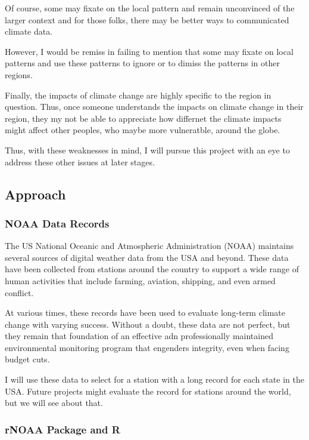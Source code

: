 \documentclass{article}
\begin{document}
Of course, some may fixate on the local pattern and remain unconvinced of the larger context and for those folks, there may be better ways to communicated climate data. 

However, I would be remiss in failing to mention that some may fixate on local patterns and use these patterns to ignore or to dimiss the patterns in other regions. 

Finally, the impacts of climate change are highly specific to the region in question. Thus, once someone understands the impacts on climate change in their region, they my not be able to appreciate how differnet the climate impacts might affect other peoples, who maybe more vulneratble, around the globe. 

Thus, with these weaknesses in mind, I will pursue this project with an eye to address these other issues at later stages.

\subsection{Approach}

\subsubsection{NOAA Data Records}

The US National Oceanic and Atmospheric Administration (NOAA) maintains several sources of digital weather data from the USA and beyond. These data have been collected from stations around the country to support a wide range of human activities that include farming, aviation, shipping, and even armed conflict. 

At various times, these records have been used to evaluate long-term climate change with varying success. Without a doubt, these data are not perfect, but they remain that foundation of an effective adn professionally maintained environmental monitoring program that engenders integrity, even when facing budget cuts. 

I will use these data to select for a station with a long record for each state in the USA. Future projects might evaluate the record for stations around the world, but we will see about that. 


\subsubsection{rNOAA Package and R}
\end{document}

